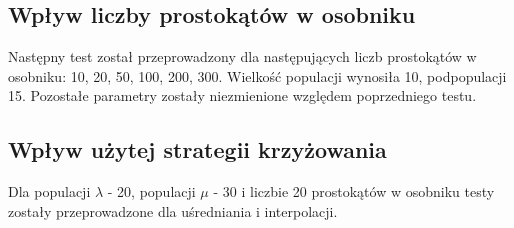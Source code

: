 \subsection*{Wpływ liczby prostokątów w osobniku}
Następny test został przeprowadzony dla następujących liczb prostokątów w osobniku: 10, 20, 50, 100, 200, 300. Wielkość populacji wynosiła 10, podpopulacji 15. Pozostałe parametry zostały niezmienione względem poprzedniego testu. 

\subsection*{Wpływ użytej strategii krzyżowania}
Dla populacji $\lambda$ - 20, populacji $\mu$ - 30 i liczbie 20 prostokątów w osobniku testy zostały przeprowadzone dla uśredniania i interpolacji.


